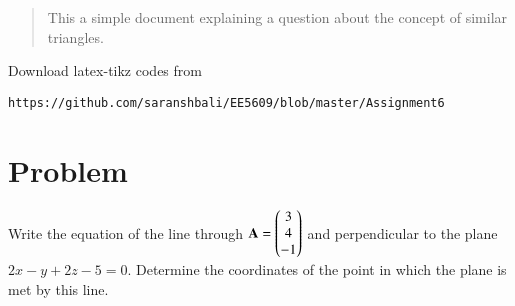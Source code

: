 \documentclass[journal,12pt,twocolumn]{IEEEtran}
\begin{document}
%
\begin{abstract}
This a simple document explaining a question about the concept of similar triangles.
\end{abstract}
%
%
Download latex-tikz codes from 
%
\begin{lstlisting}
https://github.com/saranshbali/EE5609/blob/master/Assignment6
\end{lstlisting}
%
\section{Problem}
Write the equation of the line through $\mathbf{A} = \begin{pmatrix}3 \\4\\-1\end{pmatrix}$ and perpendicular to the plane $2x-y+2z-5=0$. Determine the coordinates of the point in which the plane is met by this line.   
\end{document}
